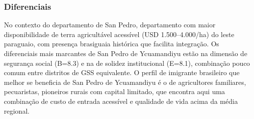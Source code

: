 \subsubsection*{Diferenciais}\label{dif-san-pedro-de-ycuamandiyu-0201}
No contexto do departamento de San Pedro, departamento com maior disponibilidade de terra agricultável acessível (USD 1.500–4.000/ha) do leste paraguaio, com presença brasiguaia histórica que facilita integração. Os diferenciais mais marcantes de San Pedro de Ycuamandiyu estão na dimensão de segurança social (B=8.3) e na de solidez institucional (E=8.1), combinação pouco comum entre distritos de GSS equivalente. O perfil de imigrante brasileiro que melhor se beneficia de San Pedro de Ycuamandiyu é o de agricultores familiares, pecuaristas, pioneiros rurais com capital limitado, que encontra aqui uma combinação de custo de entrada acessível e qualidade de vida acima da média regional.

